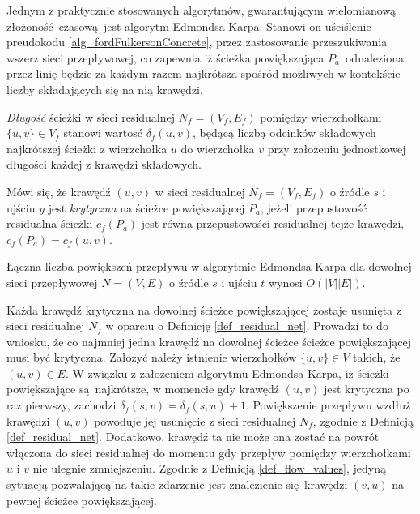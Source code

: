 \par{
  Jednym z praktycznie stosowanych algorytmów, gwarantującym wielomianową złożoność czasową jest algorytm Edmondsa-Karpa.
  Stanowi on uściślenie preudokodu \ref{alg_fordFulkersonConcrete}, przez zastosowanie przeszukiwania wszerz sieci przepływowej, co zapewnia iż ścieżka powiększająca $P_a$ odnaleziona przez linię  będzie za każdym razem najkrótsza spośród możliwych w kontekście liczby składających się na nią krawędzi.
  \begin{definition}
    \emph{Długość} ścieżki w sieci residualnej $N_f=(V_f, E_f)$ pomiędzy wierzchołkami $\{u, v\} \in V_f$ stanowi wartosć $\delta_f(u, v)$, będącą liczbą odcinków składowych najkrótszej ścieżki z wierzchołka $u$ do wierzchołka $v$ przy założeniu jednostkowej długości każdej z krawędzi składowych.
  \end{definition}
  \begin{definition}
    Mówi się, że krawędź $(u, v)$ w sieci residualnej $N_f=(V_f, E_f)$ o źródle $s$ i ujściu $y$ jest \emph{krytyczna} na ścieżce powiększającej $P_a$, jeżeli przepustowość residualna ścieżki $c_f(P_a)$ jest równa przepustowości residualnej tejże krawędzi, $c_f(P_a)=c_f(u, v)$.
  \end{definition}
  \begin{theorem}
    Łączna liczba powiększeń przepływu w algorytmie Edmondsa-Karpa dla dowolnej sieci przepływowej $N=(V, E)$ o źródle $s$ i ujściu $t$ wynosi $O(|V||E|)$.
  \end{theorem}
  \begin{bproof}
    Każda krawędź krytyczna na dowolnej ścieżce powiększającej zostaje usunięta z sieci residualnej $N_f$ w oparciu o Definicję \ref{def_residual_net}.
    Prowadzi to do wniosku, że co najmniej jedna krawędź na dowolnej ścieżce ścieżce powiększającej musi być krytyczna.
    Założyć należy istnienie wierzchołków $\{u, v\} \in V$ takich, że $(u, v) \in E$.
    W związku z założeniem algorytmu Edmondsa-Karpa, iż ścieżki powiększające są najkrótsze, w momencie gdy krawędź $(u, v)$ jest krytyczna po raz pierwszy, zachodzi $\delta_f(s, v)=\delta_f(s, u)+1$.
    Powiększenie przepływu wzdłuż krawędzi $(u, v)$ powoduje jej usunięcie z sieci residualnej $N_f$, zgodnie z Definicją \ref{def_residual_net}.
    Dodatkowo, krawędź ta nie może ona zostać na powrót włączona do sieci residualnej do momentu gdy przepływ pomiędzy wierzchołkami $u$ i $v$ nie ulegnie zmniejszeniu.
    Zgodnie z Definicją \ref{def_flow_values}, jedyną sytuacją pozwalającą na takie zdarzenie jest znalezienie się krawędzi $(v, u)$ na pewnej ścieżce powiększającej.

\end{bproof}}
